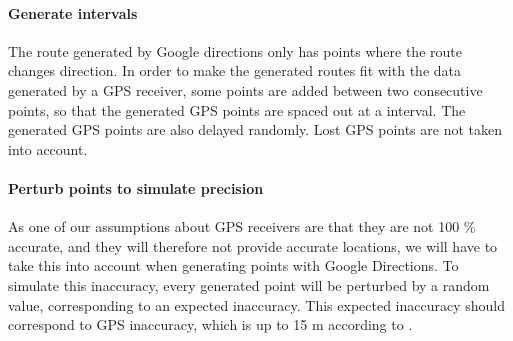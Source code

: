 \paragraph{Generate intervals} The route generated by Google directions only has points where the route changes direction.
In order to make the generated routes fit with the data generated by a GPS receiver, some points are added between two consecutive points, so that the generated GPS points are spaced out at a interval.
The generated GPS points are also delayed randomly.
Lost GPS points are not taken into account.

\paragraph{Perturb points to simulate precision} As one of our assumptions about GPS receivers are that they are not 100 \% accurate, and they will therefore not provide accurate locations, we will have to take this into account when generating points with Google Directions.
To simulate this inaccuracy, every generated point will be perturbed by a random value, corresponding to an expected inaccuracy.
This expected inaccuracy should correspond to GPS inaccuracy, which is up to 15 m according to \citet{garmingps}.
